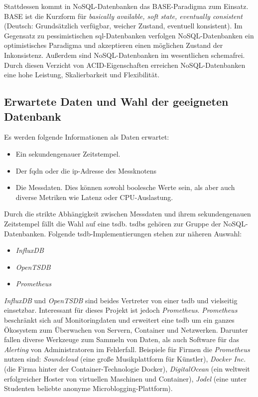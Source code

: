 \documentclass[titlepage]{report}
\begin{document}
Stattdessen kommt in NoSQL\hyp{}Datenbanken das BASE\hyp{}Paradigma zum
Einsatz. BASE ist die Kurzform für \emph{basically available, soft
state, eventually consistent} (Deutsch: Grundsätzlich verfügbar, weicher
Zustand, eventuell konsistent). Im Gegensatz zu pessimistischen
\gls{sql}\hyp{}Datenbanken verfolgen NoSQL\hyp{}Datenbanken ein
optimistisches Paradigma\cite[Siehe Seite 51]{BASE} und akzeptieren
einen möglichen Zustand der Inkonsistenz. Außerdem sind NoSQL\hyp{}Datenbanken im
wesentlichen schemafrei\cite{NOSQLKRAMER}. Durch diesen Verzicht von
ACID\hyp{}Eigenschaften erreichen NoSQL\hyp{}Datenbanken eine hohe Leistung,
Skalierbarkeit und Flexibilität\cite[Siehe Seite 11]{NOSQLPERFORMANCE}.
\subsection*{Erwartete Daten und Wahl der geeigneten Datenbank}
Es werden folgende Informationen als Daten erwartet:
\begin{itemize}
    \item Ein sekundengenauer Zeitstempel.
    \item Der \gls{fqdn} oder die \gls{ip}\hyp{}Adresse des Messknotens
    \item Die Messdaten. Dies können sowohl boolesche Werte sein, als
        aber auch diverse Metriken wie Latenz oder CPU\hyp{}Auslastung.
\end{itemize}
Durch die strikte Abhängigkeit zwischen Messdaten und
ihrem sekundengenauen Zeitstempel fällt die Wahl auf eine \gls{tsdb}.
\glspl{tsdb} gehören zur Gruppe der NoSQL\hyp{}Datenbanken.
Folgende \gls{tsdb}\hyp{}Implementierungen stehen zur näheren Auswahl:
\begin{itemize}
    \item \emph{InfluxDB}\cite{INFLUXDB}
    \item \emph{OpenTSDB}\cite{OPENTSDB}
    \item \emph{Prometheus}\cite{PROMETHEUS}
\end{itemize}
\emph{InfluxDB} und \emph{OpenTSDB} sind beides Vertreter von
einer \gls{tsdb} und vielseitig einsetzbar. Interessant für dieses
Projekt ist jedoch \emph{Prometheus}. \emph{Prometheus} beschränkt sich
auf Monitoringdaten und erweitert eine \gls{tsdb} um ein ganzes
Ökosystem zum Überwachen von Servern, Container und Netzwerken.
Darunter fallen diverse Werkzeuge zum Sammeln von Daten, als auch
Software für das \emph{Alerting} von Administratoren im Fehlerfall.
Beispiele für Firmen die \emph{Prometheus} nutzen sind:
\emph{Soundcloud} (eine große Musikplattform für Künstler), \emph{Docker
Inc.} (die Firma hinter der Container\hyp{}Technologie Docker),
\emph{DigitalOcean} (ein weltweit erfolgreicher Hoster von virtuellen Maschinen
und Container), \emph{Jodel} (eine unter Studenten beliebte anonyme
Microblogging\hyp{}Plattform)\cite{PROMETHEUS}.
\end{document}
